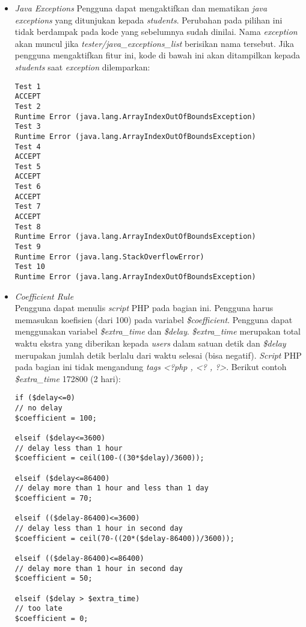 \begin{itemize}
	\item \textit{Java Exceptions}
	Pengguna dapat mengaktifkan dan mematikan \textit{java exceptions} yang ditunjukan kepada \textit{students}. Perubahan pada pilihan ini tidak berdampak pada kode yang sebelumnya sudah dinilai. Nama \textit{exception} akan muncul jika \textit{tester/java\_exceptions\_list} berisikan nama tersebut. Jika pengguna mengaktifkan fitur ini, kode di bawah ini akan ditampilkan kepada \textit{students} saat \textit{exception} dilemparkan: \newpage
	\begin{lstlisting}[backgroundcolor = \color{lightgray}]
Test 1
ACCEPT
Test 2
Runtime Error (java.lang.ArrayIndexOutOfBoundsException)
Test 3
Runtime Error (java.lang.ArrayIndexOutOfBoundsException)
Test 4
ACCEPT
Test 5
ACCEPT
Test 6
ACCEPT
Test 7
ACCEPT
Test 8
Runtime Error (java.lang.ArrayIndexOutOfBoundsException)
Test 9
Runtime Error (java.lang.StackOverflowError)
Test 10
Runtime Error (java.lang.ArrayIndexOutOfBoundsException)
	\end{lstlisting}
	
	\item \textit{\textit{Coefficient Rule}} \\
	Pengguna dapat menulis \textit{script} PHP pada bagian ini. Pengguna harus memasukan koefisien (dari 100) pada variabel \textit{\$coefficient}. Pengguna dapat menggunakan variabel \textit{\$extra\_time} dan \textit{\$delay}. \textit{\$extra\_time} merupakan total waktu ekstra yang diberikan kepada \textit{users} dalam satuan detik dan \textit{\$delay} merupakan jumlah detik berlalu dari waktu selesai (bisa negatif). \textit{Script} PHP pada bagian ini tidak mengandung \textit{tags <?php , <? , ?>}. Berikut contoh \textit{\$extra\_time} 172800 (2 hari):
	\begin{lstlisting}[backgroundcolor = \color{lightgray}]
if ($delay<=0)
// no delay
$coefficient = 100;

elseif ($delay<=3600)
// delay less than 1 hour
$coefficient = ceil(100-((30*$delay)/3600));

elseif ($delay<=86400)
// delay more than 1 hour and less than 1 day
$coefficient = 70;

elseif (($delay-86400)<=3600)
// delay less than 1 hour in second day
$coefficient = ceil(70-((20*($delay-86400))/3600));

elseif (($delay-86400)<=86400)
// delay more than 1 hour in second day
$coefficient = 50;

elseif ($delay > $extra_time)
// too late
$coefficient = 0;
	\end{lstlisting}
	

\end{itemize}
